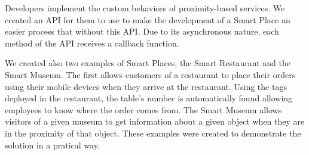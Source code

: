 Developers implement the custom behaviors of proximity-based services.
We created an \gls{API} for them to use to make the development of a Smart Place an easier process that without this \gls{API}.
Due to its asynchronous nature, each method of the \gls{API} receives a callback function.

We created also two examples of Smart Places, the Smart Restaurant and the Smart Museum.
The first allows customers of a restaurant to place their orders using their mobile devices when they arrive at the restaurant. Using the tags deployed in the restaurant, the table's number is automatically found allowing employees to know where the order comes from.
The Smart Museum allows visitors of a given museum to get information about a given object when they are in the proximity of that object.
These examples were created to demonstrate the solution in a pratical way.

